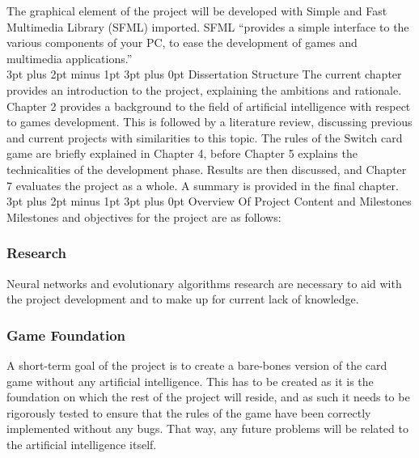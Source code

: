 \documentclass[12pt,a4paper]{article}
\makeatletter
\renewcommand\subsection{\@startsection {subsection}{1}{2mm} %
                               {3pt plus 2pt minus 1pt} %
                               {3pt plus 0pt} %
                               {\normalfont\bfseries}}
\makeatother
\begin{document}

The graphical element of the project will be developed with Simple and Fast Multimedia Library (SFML) imported. SFML \enquote{provides a simple interface to the various components of your PC, to ease the development of games and multimedia applications\citep{SFML}.}\\


\subsection{Dissertation Structure}
The current chapter provides an introduction to the project, explaining the ambitions and rationale. Chapter 2 provides a background to the field of artificial intelligence with respect to games development. This is followed by a literature review, discussing previous and current projects with similarities to this topic. The rules of the Switch card game are briefly explained in Chapter 4, before Chapter 5 explains the technicalities of the development phase. Results are then discussed, and Chapter 7 evaluates the project as a whole. A summary is provided in the final chapter. \\

 \subsection{Overview Of Project Content and Milestones}
Milestones and objectives for the project are as follows: 
\subsubsection{Research}
Neural networks and evolutionary algorithms research are necessary to aid with the project development and to make up for current lack of knowledge.

\subsubsection{Game Foundation}
A short-term goal of the project is to create a bare-bones version of the card game without any artificial intelligence. This has to be created as it is the foundation on which the rest of the project will reside, and as such it needs to be rigorously tested to ensure that the rules of the game have been correctly implemented without any bugs. That way, any future problems will be related to the artificial intelligence itself.
\end{document}
